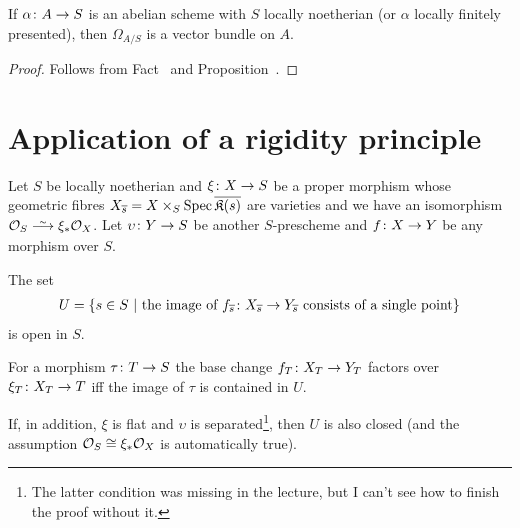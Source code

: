 \documentclass[a4paper,parskip=half,numbers=enddot, DIV=12]{scrreprt}
\begin{document}
\begin{cor}
	If $\alpha\colon A\morphism S$ is an abelian scheme with $S$ locally noetherian (or $\alpha$ locally finitely presented), then $\Omega_{A/S}$ is a vector bundle on $A$.
\end{cor}
\begin{proof}
	Follows from Fact~ and Proposition~.
\end{proof}
\section{Application of a rigidity principle}
\begin{prop}
	Let $S$ be locally noetherian and $\xi\colon X\morphism S$ be a proper morphism whose geometric fibres $X_{\overline{s}}=X\times_S\operatorname{Spec}\overline{\mathfrak{K}(s)}$ are varieties and we have an isomorphism $\Oo_S\isomorphism\xi_*\Oo_X$. Let $\upsilon \colon Y\morphism S$ be another $S$-prescheme and $f\colon X\morphism Y$ be any morphism over $S$.
	\begin{alphanumerate}
		\item The set 
		\begin{align*}
			U=\left\{s\in S\ \middle|\  \text{the image of }f_{\overline{s}}\colon X_{\overline{s}}\to Y_{\overline{s}}\text{ consists of  a single point}\right\}
		\end{align*}
		is open in $S$.
		\item For a morphism $\tau\colon T\morphism S$ the base change $f_T\colon X_T\morphism Y_T$ factors over $\xi_T\colon X_T\morphism T$ iff the image of $\tau$ is contained in $U$.
		\item If, in addition, $\xi$ is flat and $\upsilon$ is separated\footnote{The latter condition was missing in the lecture, but I can't see how to finish the proof without it.}, then $U$ is also closed (and the assumption $\mathcal{O}_S\cong\xi_*\mathcal{O}_X$ is automatically true).
	\end{alphanumerate}
\end{prop}
\end{document}
